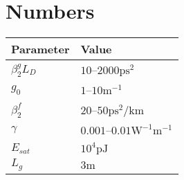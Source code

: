 \documentclass[12pt]{article}
\newcommand{\Es}{E_{sat}}
\begin{document}
\newpage
\appendix
\section{Numbers}

\begin{table}
\begin{tabular}{|l|l|}
\hline
Parameter & Value \\
\hline
$\beta_2^g L_D$ & $10$--$2000 \text{ps}^2$ \\
$g_0$ & $1$--$10 \text{m}^{-1}$ \\
$\beta_2^f$ & $20$--$50 \text{ps}^2/ \text{km}$ \\
$\gamma$ & $0.001$--$0.01 \text{W}^{-1} \text{m}^{-1}$ \\
$\Es$ & $10^4 \text{pJ}$ \\
$L_g$ & $3 \text{m}$ \\
\hline
\end{tabular}
\end{table}


\newpage
\printbibliography
\end{document}
